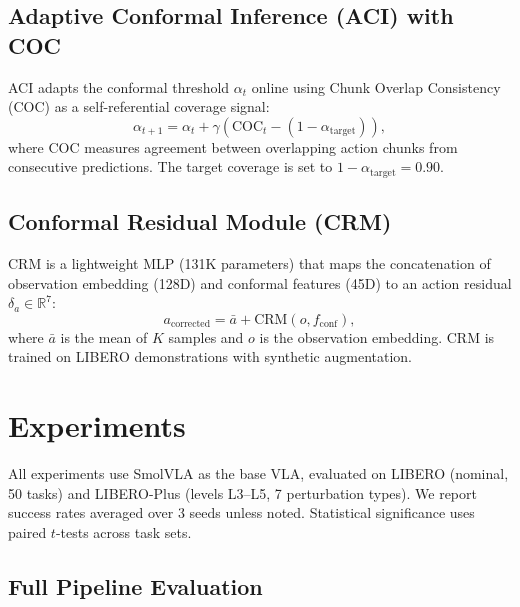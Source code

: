 \documentclass[letterpaper]{article}
\begin{document}
\subsection{Adaptive Conformal Inference (ACI) with COC}

ACI adapts the conformal threshold $\alpha_t$ online using Chunk Overlap Consistency (COC) as a self-referential coverage signal:
\begin{equation}
\alpha_{t+1} = \alpha_t + \gamma (\mathrm{COC}_t - (1-\alpha_{\mathrm{target}})),
\end{equation}
where COC measures agreement between overlapping action chunks from consecutive predictions. The target coverage is set to $1-\alpha_{\mathrm{target}} = 0.90$.

\subsection{Conformal Residual Module (CRM)}

CRM is a lightweight MLP (131K parameters) that maps the concatenation of observation embedding (128D) and conformal features (45D) to an action residual $\delta_a \in \mathbb{R}^7$:
\begin{equation}
a_{\mathrm{corrected}} = \bar{a} + \mathrm{CRM}(o, f_{\mathrm{conf}}),
\end{equation}
where $\bar{a}$ is the mean of $K$ samples and $o$ is the observation embedding. CRM is trained on LIBERO demonstrations with synthetic augmentation.

\section{Experiments}
\label{sec:experiments}

All experiments use SmolVLA as the base VLA, evaluated on LIBERO (nominal, 50 tasks) and LIBERO-Plus (levels L3--L5, 7 perturbation types). We report success rates averaged over 3 seeds unless noted. Statistical significance uses paired $t$-tests across task sets.

\subsection{Full Pipeline Evaluation}
\label{sec:exp-full}
\end{document}
